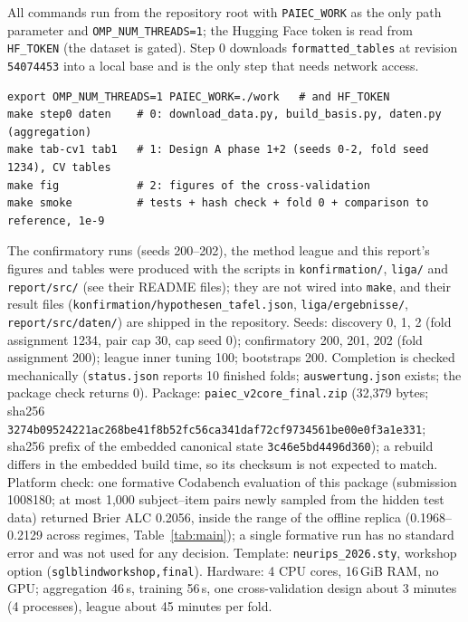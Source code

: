 \documentclass{article}
\newcommand{\pkgfile}{paiec\_v2core\_final.zip}
\newcommand{\pkghashtex}{3274b09524221ac268be41f8b52fc56c\allowbreak a341daf72cf9734561be00e0f3a1e331}
\newcommand{\pkgbytes}{32,379}
\newcommand{\pkgstate}{3c46e5bd4496d360}
\begin{document}
All commands run from the repository root with \texttt{PAIEC\_WORK} as the only path parameter and
\texttt{OMP\_NUM\_THREADS=1}; the Hugging Face token is read from \texttt{HF\_TOKEN} (the dataset is gated). Step 0
downloads \texttt{formatted\_tables} at revision \texttt{54074453} into a local base and is the only step that needs
network access.
\par\noindent\begin{minipage}{\linewidth}\small
\begin{verbatim}
export OMP_NUM_THREADS=1 PAIEC_WORK=./work   # and HF_TOKEN
make step0 daten    # 0: download_data.py, build_basis.py, daten.py (aggregation)
make tab-cv1 tab1   # 1: Design A phase 1+2 (seeds 0-2, fold seed 1234), CV tables
make fig            # 2: figures of the cross-validation
make smoke          # tests + hash check + fold 0 + comparison to reference, 1e-9
\end{verbatim}
\end{minipage}\par\medskip
The confirmatory runs (seeds 200--202), the method league and this report's figures and tables were produced with the
scripts in \texttt{konfirmation/}, \texttt{liga/} and \texttt{report/src/} (see their README files); they are not wired
into \texttt{make}, and their result files (\texttt{konfirmation/hypothesen\_tafel.json}, \texttt{liga/ergebnisse/},
\texttt{report/src/daten/}) are shipped in the repository.
Seeds: discovery 0, 1, 2 (fold assignment 1234, pair cap 30, cap seed 0); confirmatory 200, 201, 202 (fold assignment 200); league
inner tuning 100; bootstraps 200. Completion is checked mechanically (\texttt{status.json} reports 10 finished folds;
\texttt{auswertung.json} exists; the package check returns 0). Package: \texttt{\pkgfile} (\pkgbytes{} bytes; sha256
\texttt{\pkghashtex}; sha256 prefix of the embedded canonical state \texttt{\pkgstate}); a rebuild differs in the
embedded build time, so its checksum is not expected to match. Platform check: one formative Codabench evaluation of this package (submission 1008180; at most 1,000 subject--item pairs newly sampled from the hidden test data) returned Brier ALC 0.2056, inside the range of the offline replica (0.1968--0.2129 across regimes, Table~\ref{tab:main}); a single formative run has no standard error and was not used for any decision. Template: \texttt{neurips\_2026.sty}, workshop option
(\texttt{sglblindworkshop,final}). Hardware: 4 CPU cores, 16\,GiB RAM, no GPU; aggregation
46\,s, training 56\,s, one cross-validation design about 3 minutes (4 processes), league about 45 minutes per fold.
\end{document}
